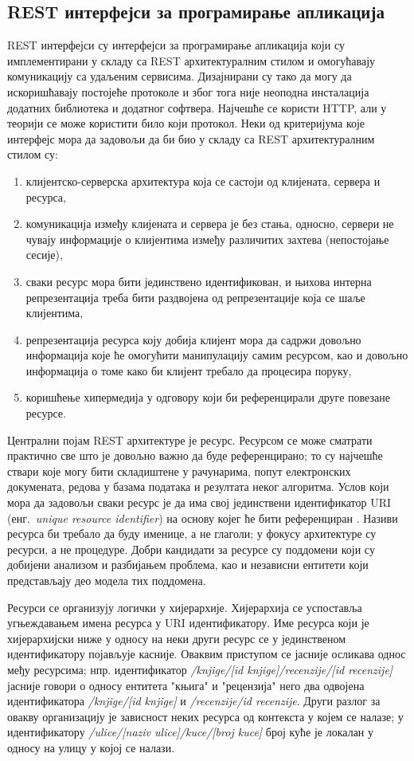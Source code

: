 \documentclass[12pt,oneside]{memoir}
\begin{document}
\subsection{REST интерфејси за програмирање апликација}
REST интерфејси су интерфејси за програмирање апликација који су имплементирани у складу са REST архитектуралним стилом и омогућавају комуникацију са удаљеним сервисима. Дизајнирани су тако да могу да искоришћавају постојеће протоколе и због тога није неоподна инсталација додатних библиотека и додатног софтвера. Најчешће се користи HTTP, али у теорији се може користити било који протокол. Неки од критеријума које интерфејс мора да задовољи да би био у складу са REST архитектуралним стилом су:
\begin{enumerate}
\item клијентско-серверска архитектура која се састоји од клијената, сервера и ресурса,
\item комуникација између клијената и сервера је без стања, односно, сервери не чувају информације о клијентима између различитих захтева (непостојање сесије),
\item сваки ресурс мора бити јединствено идентификован, и њихова интерна репрезентација треба бити раздвојена од репрезентације која се шаље клијентима,
\item репрезентација ресурса коју добија клијент мора да садржи довољно информација које ће омогућити манипулацију самим ресурсом, као и довољно информација о томе како би клијент требало да процесира поруку,
\item коришћење хипермедија у одговору који би референцирали друге повезане ресурсе.
\end{enumerate}
Централни појам REST архитектуре је ресурс. Ресурсом се може сматрати практично све што је довољно важно да буде референцирано; то су најчешће ствари које могу бити складиштене у рачунарима, попут електронских докумената, редова у базама података и резултата неког алгоритма. Услов који мора да задовољи сваки ресурс је да има свој јединствени идентификатор URI (енг.~\textit{unique resource identifier}) на основу којег ће бити референциран \cite{RESTfulWebAPIs}. Називи ресурса би требало да буду именице, а не глаголи; у фокусу архитектуре су ресурси, а не процедуре. Добри кандидати за ресурсе су поддомени који су добијени анализом и разбијањем проблема, као и независни ентитети који представљају део модела тих поддомена.

Ресурси се организују логички у хијерархије. Хијерархија се успоставља угњеждавањем имена ресурса у URI идентификатору. Име ресурса који је хијерархијски ниже у односу на неки други ресурс се у јединственом идентификатору појављује касније. Оваквим приступом се јасније осликава однос међу ресурсима; нпр. идентификатор \textit{/knjige/[id knjige]/recenzije/[id recenzije]} јасније говори о односу ентитета "књига" и "рецензија" него два одвојена идентификатора \textit{/knjige/[id knjige]} и \textit{/recenzije/id recenzije}. Други разлог за овакву организацију је зависност неких ресурса од контекста у којем се налазе; у идентификатору \textit{/ulice/[naziv ulice]/kuce/[broj kuce]} број куће је локалан у односу на улицу у којој се налази.
\end{document}
